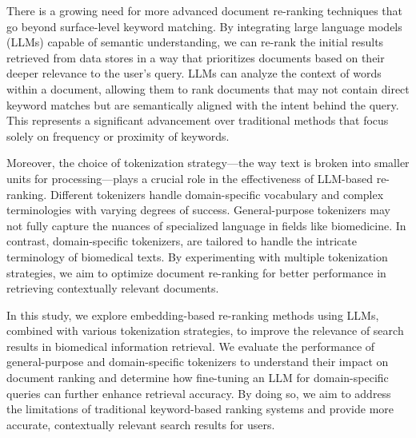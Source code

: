 There is a growing need for more advanced document re-ranking techniques that go beyond surface-level keyword matching. By integrating large language models (LLMs) capable of semantic understanding, we can re-rank the initial results retrieved from data stores in a way that prioritizes documents based on their deeper relevance to the user’s query. LLMs can analyze the context of words within a document, allowing them to rank documents that may not contain direct keyword matches but are semantically aligned with the intent behind the query. This represents a significant advancement over traditional methods that focus solely on frequency or proximity of keywords.

Moreover, the choice of tokenization strategy—the way text is broken into smaller units for processing—plays a crucial role in the effectiveness of LLM-based re-ranking. Different tokenizers handle domain-specific vocabulary and complex terminologies with varying degrees of success. General-purpose tokenizers may not fully capture the nuances of specialized language in fields like biomedicine. In contrast, domain-specific tokenizers, are tailored to handle the intricate terminology of biomedical texts. By experimenting with multiple tokenization strategies, we aim to optimize document re-ranking for better performance in retrieving contextually relevant documents.

In this study, we explore embedding-based re-ranking methods using LLMs, combined with various tokenization strategies, to improve the relevance of search results in biomedical information retrieval. We evaluate the performance of general-purpose and domain-specific tokenizers to understand their impact on document ranking and determine how fine-tuning an LLM for domain-specific queries can further enhance retrieval accuracy. By doing so, we aim to address the limitations of traditional keyword-based ranking systems and provide more accurate, contextually relevant search results for users.

